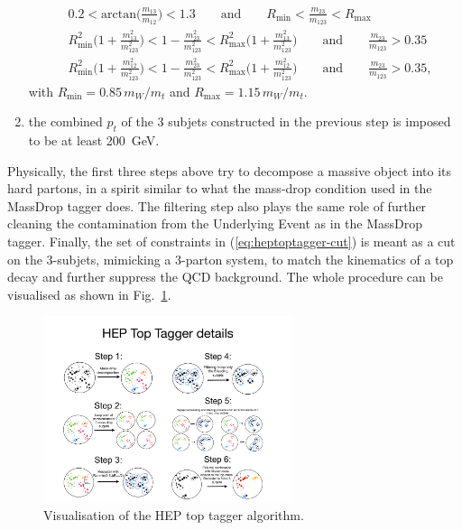 \begin{enumerate}
\begin{align}\label{eq:heptoptagger-cut}
&0.2<\text{arctan}\Big(\frac{m_{13}}{m_{12}}\Big)<1.3
\qquad\text{and}\qquad
R_{\text{min}}<\frac{m_{23}}{m_{123}}<R_{\text{max}}\\
&R_{\text{min}}^2\bigg(1+\frac{m_{13}^2}{m_{123}^2}\bigg)
  < 1-\frac{m_{23}^2}{m_{123}^2}
  < R_{\text{max}}^2\bigg(1+\frac{m_{13}^2}{m_{123}^2}\bigg)
\qquad\text{and}\qquad
\frac{m_{23}}{m_{123}}>0.35\nonumber\\
&R_{\text{min}}^2\bigg(1+\frac{m_{12}^2}{m_{123}^2}\bigg)
  < 1-\frac{m_{23}^2}{m_{123}^2}
  < R_{\text{max}}^2\bigg(1+\frac{m_{12}^2}{m_{123}^2}\bigg)
\qquad\text{and}\qquad
\frac{m_{23}}{m_{123}}>0.35,\nonumber
\end{align}
with $R_{\text{min}}=0.85\, m_W/m_t$ and $R_{\text{max}}=1.15\,
m_W/m_t$.
\item the combined $p_t$ of the 3 subjets constructed in the previous
  step is imposed to be at least 200~GeV.
\end{enumerate}

Physically, the first three steps above try to decompose a massive
object into its hard partons, in a spirit similar to what the
mass-drop condition used in the MassDrop tagger does.
%
The filtering step also plays the same role of further cleaning the
contamination from the Underlying Event as in the MassDrop tagger.
%
Finally, the set of constraints in (\ref{eq:heptoptagger-cut}) is
meant as a cut on the 3-subjets, mimicking a 3-parton system, to match
the kinematics of a top decay and further suppress the QCD
background. The whole procedure can be visualised as shown in Fig.~\ref{fig:heptoptagger}.

\begin{figure}
  \centerline{\includegraphics[width=0.65\textwidth]{figures/heptoptagger.pdf}}
  \caption{Visualisation of the HEP top tagger algorithm.}\label{fig:heptoptagger}
\end{figure}

